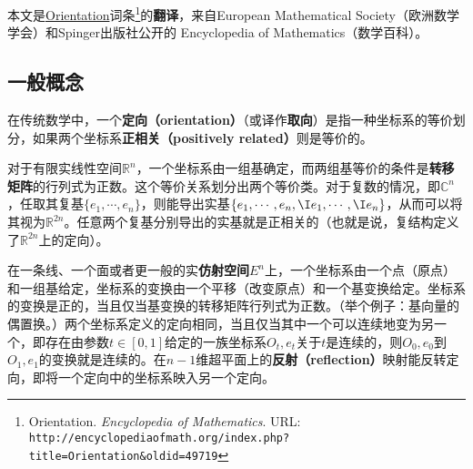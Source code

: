 
本文是\href{https://encyclopediaofmath.org/wiki/Orientation}{Orientation}词条\footnote{Orientation. \textsl{Encyclopedia of Mathematics}. URL: \lstinline|http://encyclopediaofmath.org/index.php?title=Orientation&oldid=49719|}的\textbf{翻译}，来自European Mathematical Society（欧洲数学学会）和Spinger出版社公开的 Encyclopedia of Mathematics（数学百科）。



\subsection{一般概念}

在传统数学中，一个\textbf{定向（orientation）}（或译作\textbf{取向}）是指一种坐标系的等价划分，如果两个坐标系\textbf{正相关（positively related）}则是等价的。


对于有限实线性空间$\mathbb{R}^n$，一个坐标系由一组基确定，而两组基等价的条件是\textbf{转移矩阵}的行列式为正数。这个等价关系划分出两个等价类。对于复数的情况，即$\mathbb{C}^n$，任取其复基$\{e_1, \cdots, e_n\}$，则能导出实基$\{e_1, \cdots, e_n, \I e_1, \cdots, \I e_n\}$，从而可以将其视为$\mathbb{R}^{2n}$。任意两个复基分别导出的实基就是正相关的（也就是说，复结构定义了$\mathbb{R}^{2n}$上的定向）。


在一条线、一个面或者更一般的实\textbf{仿射空间}$E^n$上，一个坐标系由一个点（原点）和一组基给定，坐标系的变换由一个平移（改变原点）和一个基变换给定。坐标系的变换是正的，当且仅当基变换的转移矩阵行列式为正数。（举个例子：基向量的偶置换。）两个坐标系定义的定向相同，当且仅当其中一个可以连续地变为另一个，即存在由参数$t\in[0, 1]$给定的一族坐标系$O_t, e_t$关于$t$是连续的，则$O_0, e_0$到$O_1, e_1$的变换就是连续的。在$n-1$维超平面上的\textbf{反射（reflection）}映射能反转定向，即将一个定向中的坐标系映入另一个定向。


